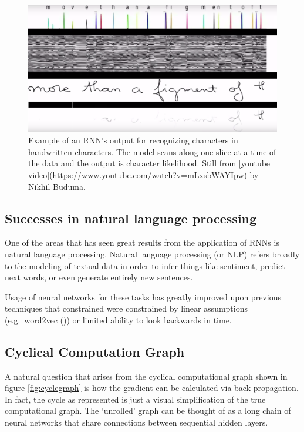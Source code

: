 \documentclass[]{book}
\theoremstyle{definition}
\theoremstyle{definition}
\theoremstyle{definition}
\theoremstyle{remark}
\begin{document}
\begin{figure}

{\centering \includegraphics[width=0.9\linewidth]{figures/handwriting_rnn} 

}

\caption{Example of an RNN's output for recognizing characters in handwritten characters. The model scans along one slice at a time of the data and the output is character likelihood. Still from [youtube video](https://www.youtube.com/watch?v=mLxsbWAYIpw) by Nikhil Buduma.}\label{fig:unnamed-chunk-3}
\end{figure}

\subsection{Successes in natural language
processing}\label{successes-in-natural-language-processing}

One of the areas that has seen great results from the application of
RNNs is natural language processing. Natural language processing (or
NLP) refers broadly to the modeling of textual data in order to infer
things like sentiment, predict next words, or even generate entirely new
sentences.

Usage of neural networks for these tasks has greatly improved upon
previous techniques that constrained were constrained by linear
assumptions (e.g.~word2vec (\citet{word2vec})) or limited ability to
look backwards in time.

\subsection{Cyclical Computation
Graph}\label{cyclical-computation-graph}

A natural question that arises from the cyclical computational graph
shown in figure \ref{fig:cyclegraph} is how the gradient can be
calculated via back propagation. In fact, the cycle as represented is
just a visual simplification of the true computational graph. The
`unrolled' graph can be thought of as a long chain of neural networks
that share connections between sequential hidden layers.
\end{document}

